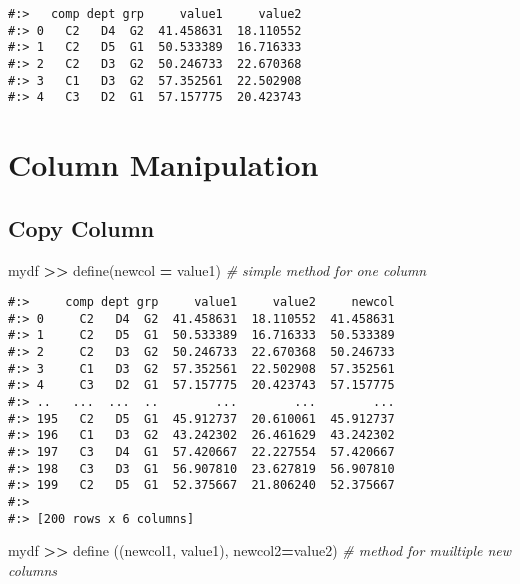 \documentclass[
]{book}
\newenvironment{Shaded}{\begin{snugshade}}{\end{snugshade}}
\newcommand{\CommentTok}[1]{\textcolor[rgb]{0.37,0.37,0.37}{\textit{#1}}}
\newcommand{\NormalTok}[1]{#1}
\newcommand{\OperatorTok}[1]{\textcolor[rgb]{0.43,0.43,0.43}{\textbf{#1}}}
\newcommand{\StringTok}[1]{\textcolor[rgb]{0.5,0.5,0.5}{#1}}
\begin{document}
\begin{verbatim}
#:>   comp dept grp     value1     value2
#:> 0   C2   D4  G2  41.458631  18.110552
#:> 1   C2   D5  G1  50.533389  16.716333
#:> 2   C2   D3  G2  50.246733  22.670368
#:> 3   C1   D3  G2  57.352561  22.502908
#:> 4   C3   D2  G1  57.157775  20.423743
\end{verbatim}

\hypertarget{column-manipulation}{%
\section{Column Manipulation}\label{column-manipulation}}

\hypertarget{copy-column}{%
\subsection{Copy Column}\label{copy-column}}

\begin{Shaded}
\begin{Highlighting}[]
\NormalTok{mydf }\OperatorTok{\textgreater{}\textgreater{}}\NormalTok{ define(newcol }\OperatorTok{=} \StringTok{\textquotesingle{}value1\textquotesingle{}}\NormalTok{)                 }\CommentTok{\# simple method for one column}
\end{Highlighting}
\end{Shaded}

\begin{verbatim}
#:>     comp dept grp     value1     value2     newcol
#:> 0     C2   D4  G2  41.458631  18.110552  41.458631
#:> 1     C2   D5  G1  50.533389  16.716333  50.533389
#:> 2     C2   D3  G2  50.246733  22.670368  50.246733
#:> 3     C1   D3  G2  57.352561  22.502908  57.352561
#:> 4     C3   D2  G1  57.157775  20.423743  57.157775
#:> ..   ...  ...  ..        ...        ...        ...
#:> 195   C2   D5  G1  45.912737  20.610061  45.912737
#:> 196   C1   D3  G2  43.242302  26.461629  43.242302
#:> 197   C3   D4  G1  57.420667  22.227554  57.420667
#:> 198   C3   D3  G1  56.907810  23.627819  56.907810
#:> 199   C2   D5  G1  52.375667  21.806240  52.375667
#:> 
#:> [200 rows x 6 columns]
\end{verbatim}

\begin{Shaded}
\begin{Highlighting}[]
\NormalTok{mydf }\OperatorTok{\textgreater{}\textgreater{}}\NormalTok{ define ((}\StringTok{\textquotesingle{}newcol1\textquotesingle{}}\NormalTok{, }\StringTok{\textquotesingle{}value1\textquotesingle{}}\NormalTok{), newcol2}\OperatorTok{=}\StringTok{\textquotesingle{}value2\textquotesingle{}}\NormalTok{)  }\CommentTok{\# method for muiltiple new columns}
\end{Highlighting}
\end{Shaded}
\end{document}
